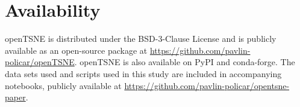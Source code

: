 \documentclass[twocolumn]{bmcart}
\begin{document}
\section*{Availability}

openTSNE is distributed under the BSD-3-Clause License and is publicly available as an open-source package at \url{https://github.com/pavlin-policar/openTSNE}. openTSNE is also available on PyPI and conda-forge. The data sets used and scripts used in this study are included in accompanying notebooks, publicly available at \url{https://github.com/pavlin-policar/opentsne-paper}.

\end{document}
